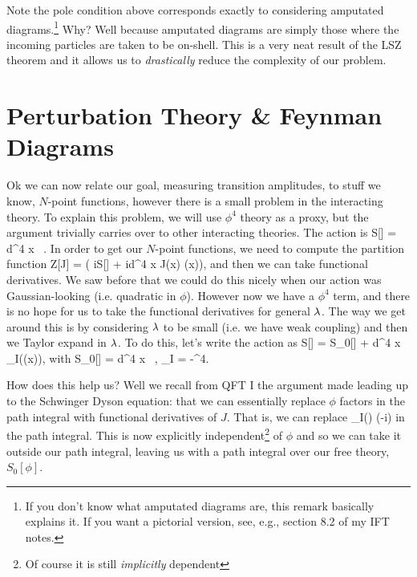 \br 
    Note the pole condition above corresponds exactly to considering amputated diagrams.\footnote{If you don't know what amputated diagrams are, this remark basically explains it. If you want a pictorial version, see, e.g., section 8.2 of my IFT notes.} Why? Well because amputated diagrams are simply those where the incoming particles are taken to be on-shell. This is a very neat result of the LSZ theorem and it allows us to \textit{drastically} reduce the complexity of our problem. 
\er 

\section{Perturbation Theory \& Feynman Diagrams}

Ok we can now relate our goal, measuring transition amplitudes, to stuff we know, $N$-point functions, however there is a small problem in the interacting theory. To explain this problem, we will use $\phi^4$ theory as a proxy, but the argument trivially carries over to other interacting theories. The action is
\bse 
    S[\phi] = \int d^4 x \, .
\ese
In order to get our $N$-point functions, we need to compute the partition function
\bse 
    Z[J] = \int [\pD\phi] \exp\bigg( iS[\phi] + i\int d^4 x J(x) \phi(x)\bigg),
\ese
and then we can take functional derivatives. We saw before that we could do this nicely when our action was Gaussian-looking (i.e. quadratic in $\phi$). However now we have a $\phi^4$ term, and there is no hope for us to take the functional derivatives for general $\lambda$. The way we get around this is by considering $\lambda$ to be small (i.e. we have weak coupling) and then we Taylor expand in $\lambda$. To do this, let's write the action as 
\bse 
    S[\phi] = S_0[\phi] + \int d^4 x \cL_I\big(\phi(x)\big),
\ese 
with 
\bse 
    S_0[\phi] = \int d^4 x \, , \qand \cL_I = -\phi^4.
\ese 

How does this help us? Well we recall from QFT I the argument made leading up to the Schwinger Dyson equation: that we can essentially replace $\phi$ factors in the path integral with functional derivatives of $J$. That is, we can replace 
\bse 
    \cL_I(\phi) \to \cL \bigg(-i\bigg)
\ese 
in the path integral. This is now explicitly independent\footnote{Of course it is still \textit{implicitly} dependent} of $\phi$ and so we can take it outside our path integral, leaving us with a path integral over our free theory, $S_0[\phi]$. 

